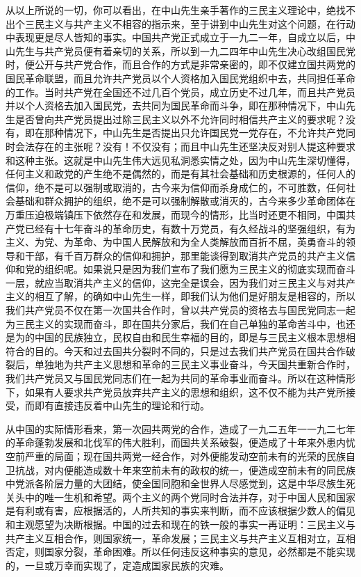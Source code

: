 从以上所说的一切，你可以看出，在中山先生亲手著作的三民主义理论中，绝找不出个三民主义与共产主义不相容的指示来，至于讲到中山先生对这个问题，在行动中表现更是尽人皆知的事实。中国共产党正式成立于一九二一年，自成立以后，中山先生与共产党员便有着亲切的关系，所以到一九二四年中山先生决心改组国民党时，便公开与共产党合作，而且合作的方式是非常亲密的，即不仅建立国共两党的国民革命联盟，而且允许共产党员以个人资格加入国民党组织中去，共同担任革命的工作。当时共产党在全国还不过几百个党员，成立历史不过几年，而且共产党员并以个人资格去加入国民党，去共同为国民革命而斗争，即在那种情况下，中山先生是否曾向共产党员提出过除三民主义以外不允许同时相信共产主义的要求呢？没有，即在那种情况下，中山先生是否提出只允许国民党一党存在，不允许共产党同时会法存在的主张呢？没有！不仅没有；而且中山先生还坚决反对别人提这种要求和这种主张。这就是中山先生伟大远见私洞悉实情之处，因为中山先生深切懂得，任何主义和政党的产生绝不是偶然的，而是有其社会基础和历史根源的，任何人的信仰，绝不是可以强制或取消的，古今来为信仰而杀身成仁的，不可胜数，任何社会基础和群众拥护的组织，绝不是可以强制解散或消灭的，古今来多少革命团体在万重压迫极端镇压下依然存在和发展，而现今的情形，比当时还更不相同，中国共产党已经有十七年奋斗的革命历史，有数十万党员，有久经战斗的坚强组织，有为主义、为党、为革命、为中国人民解放和为全人类解放而百折不屈，英勇奋斗的领导和干部，有千百万群众的信仰和拥护，那里能谈得到取消共产党员的共产主义信仰和党的组织呢。如果说只是因为我们宣布了我们愿为三民主义的彻底实现而奋斗一层，就应当取消共产主义的信仰，这完全是误会，因为我们对三民主义与对共产主义的相互了解，的确如中山先生一样，即我们认为他们是好朋友是相容的，所以我们共产党员不仅在第一次国共合作时，曾以共产党员的资格去与国民党同志一起为三民主义的实现而奋斗，即在国共分家后，我们在自己单独的革命苦斗中，也还是为的中国的民族独立，民权自由和民生幸福的目的，即是与三民主义根本思想相符合的目的。今天和过去国共分裂时不同的，只是过去我们共产党员在国共合作破裂后，单独地为共产主义思想和革命的三民主义事业奋斗，今天国共重新合作时，我们共产党员又与国民党同志们在一起为共同的革命事业而奋斗。所以在这种情形下，如果有人要求共产党员放弃共产主义的思想和组织，这不仅不能为共产党所接受，而即有直接违反着中山先生的理论和行动。

从中国的实际情形看来，第一次园共两党的合作，造成了一九二五年一一九二七年的革命蓬勃发展和北伐军的伟大胜利，而国共关系破裂，便造成了十年来外患内忧空前严重的局面；现在国共两党一经合作，对外便能发动空前未有的光荣的民族自卫抗战，对内便能造成数十年来空前未有的政权的统一，便造成空前未有的同民族中党派各阶层力量的大团结，使全国同胞和全世界人尽感觉到，这是中华尽族生死关头中的唯一生机和希望。两个主义的两个党同时合法并存，对于中国人民和国家是有利或有害，应根据活的，人所共知的事实来判断，而不应该根据少数人的偏见和主观愿望为决断根据。中国的过去和现在的铁一般的事实一再证明：三民主义与共产主义互相合作，则国家统一，革命发展；三民主义与共产主义互相对立，互相否定，则国家分裂，革命困难。所以任何违反这种事实的意见，必然都是不能实现的，一旦或万幸而实现了，定造成国家民族的灾难。

